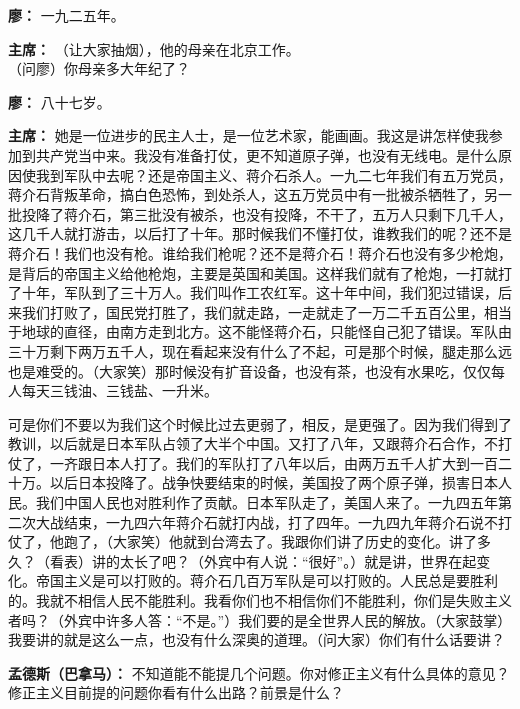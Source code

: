 \begin{duihua}
\item[\textbf{廖：}] 一九二五年。

\item[\textbf{主席：}] （让大家抽烟），他的母亲在北京工作。\\（问廖）你母亲多大年纪了？

\item[\textbf{廖：}] 八十七岁。

\item[\textbf{主席：}] 她是一位进步的民主人士，是一位艺术家，能画画。我这是讲怎样使我参加到共产党当中来。我没有准备打仗，更不知道原子弹，也没有无线电。是什么原因使我到军队中去呢？还是帝国主义、蒋介石杀人。一九二七年我们有五万党员，蒋介石背叛革命，搞白色恐怖，到处杀人，这五万党员中有一批被杀牺牲了，另一批投降了蒋介石，第三批没有被杀，也没有投降，不干了，五万人只剩下几千人，这几千人就打游击，以后打了十年。那时候我们不懂打仗，谁教我们的呢？还不是蒋介石！我们也没有枪。谁给我们枪呢？还不是蒋介石！蒋介石也没有多少枪炮，是背后的帝国主义给他枪炮，主要是英国和美国。这样我们就有了枪炮，一打就打了十年，军队到了三十万人。我们叫作工农红军。这十年中间，我们犯过错误，后来我们打败了，国民党打胜了，我们就走路，一走就走了一万二千五百公里，相当于地球的直径，由南方走到北方。这不能怪蒋介石，只能怪自己犯了错误。军队由三十万剩下两万五千人，现在看起来没有什么了不起，可是那个时候，腿走那么远也是难受的。（大家笑）那时候没有扩音设备，也没有茶，也没有水果吃，仅仅每人每天三钱油、三钱盐、一升米。

可是你们不要以为我们这个时候比过去更弱了，相反，是更强了。因为我们得到了教训，以后就是日本军队占领了大半个中国。又打了八年，又跟蒋介石合作，不打仗了，一齐跟日本人打了。我们的军队打了八年以后，由两万五千人扩大到一百二十万。以后日本投降了。战争快要结束的时候，美国投了两个原子弹，损害日本人民。我们中国人民也对胜利作了贡献。日本军队走了，美国人来了。一九四五年第二次大战结束，一九四六年蒋介石就打内战，打了四年。一九四九年蒋介石说不打仗了，他跑了，（大家笑）他就到台湾去了。我跟你们讲了历史的变化。讲了多久？（看表）讲的太长了吧？（外宾中有人说：“很好”。）就是讲，世界在起变化。帝国主义是可以打败的。蒋介石几百万军队是可以打败的。人民总是要胜利的。我就不相信人民不能胜利。我看你们也不相信你们不能胜利，你们是失败主义者吗？（外宾中许多人答：“不是。”）我们要的是全世界人民的解放。（大家鼓掌）我要讲的就是这么一点，也没有什么深奥的道理。（问大家）你们有什么话要讲？

\item[\textbf{孟德斯（巴拿马）：}] 不知道能不能提几个问题。你对修正主义有什么具体的意见？修正主义目前提的问题你看有什么出路？前景是什么？


\end{duihua}
